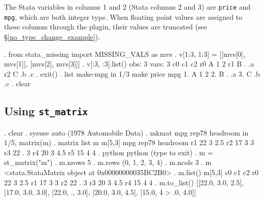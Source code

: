 \documentclass{article}
\begin{document}
\medskip

The Stata variables in columns 1 and 2 (Stata columns 2 and 3) are \lstinline{price} and \lstinline{mpg}, which are both integer type. When floating point values are assigned to these columns through the plugin, their values are truncated (see \S\ref{no_type_change_example}).

\begin{stlog}
{\bftt{>>>}}. from stata_missing import MISSING_VALS as mvs
{\smallskip}
{\bftt{>>>}}. v[1:3, 1:3] = [[mvs[0], mvs[1]], [mvs[2], mvs[3]]]
{\smallskip}
{\bftt{>>>}}. v[:3, :3].list()
{\smallskip}
  obs: 3
 vars: 3
{\smallskip}
            c0        c1        c2
r0           A         1         2
r1           B         .        .a
r2           C        .b        .c
{\smallskip}
{\bftt{>>>}}. exit()
{\smallskip}
. list make-mpg in 1/3
{\smallskip}
     {\TLC}
     {\VBAR} make   price   mpg {\VBAR}
     {\LFTT}
  1. {\VBAR} A          1     2 {\VBAR}
  2. {\VBAR} B          .    .a {\VBAR}
  3. {\VBAR} C         .b    .c {\VBAR}
     {\BLC}
{\smallskip}
. clear
\end{stlog}

\smallskip



\subsection{Using \lstinline{st_matrix}} \label{st_matrix_example}

\begin{stlog}
. clear
{\smallskip}
. sysuse auto
(1978 Automobile Data)
{\smallskip}
. mkmat mpg rep78 headroom in 1/5, matrix(m)
{\smallskip}
. matrix list m
{\smallskip}
m[5,3]
         mpg     rep78  headroom
r1        22         3       2.5
r2        17         3         3
r3        22         .         3
r4        20         3       4.5
r5        15         4         4
{\smallskip}
. python
 python (type {} to exit) 
{\bftt{>>>}}. m = st_matrix("m")
{\smallskip}
{\bftt{>>>}}. m.nrows
5
{\smallskip}
{\bftt{>>>}}. m.rows
(0, 1, 2, 3, 4)
{\smallskip}
{\bftt{>>>}}. m.ncols
3
{\smallskip}
{\bftt{>>>}}. m
<stata.StataMatrix object at 0x00000000035BC2B0>
{\smallskip}
{\bftt{>>>}}. m.list()
{\smallskip}
m[5,3]
           c0         c1         c2
r0         22          3        2.5
r1         17          3          3
r2         22          .          3
r3         20          3        4.5
r4         15          4          4
{\smallskip}
. m.to_list()
[[22.0, 3.0, 2.5], [17.0, 3.0, 3.0], [22.0, ., 3.0], [20.0, 3.0, 4.5], [15.0, 4
> .0, 4.0]]
\end{stlog}
\end{document}
